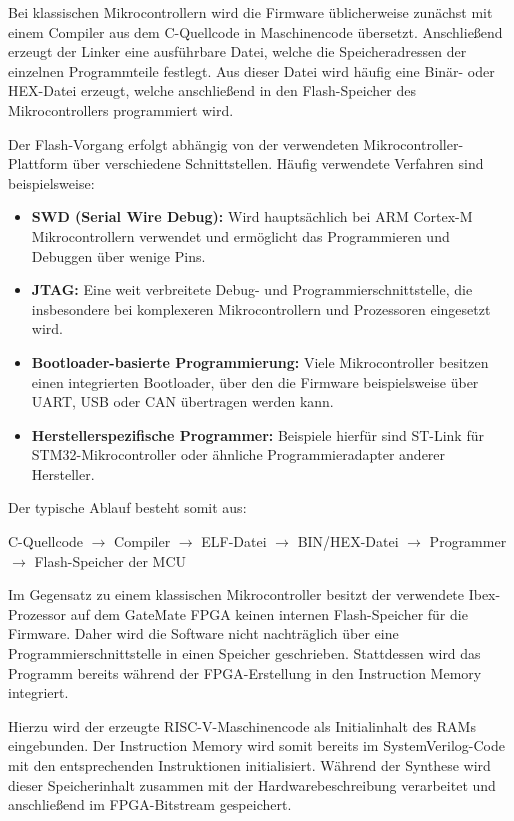 \documentclass[a4paper,11pt]{article}
\begin{document}
Bei klassischen Mikrocontrollern wird die Firmware üblicherweise zunächst mit einem Compiler aus dem C-Quellcode in Maschinencode übersetzt. Anschließend erzeugt der Linker eine ausführbare Datei, welche die Speicheradressen der einzelnen Programmteile festlegt. Aus dieser Datei wird häufig eine Binär- oder HEX-Datei erzeugt, welche anschließend in den Flash-Speicher des Mikrocontrollers programmiert wird.

Der Flash-Vorgang erfolgt abhängig von der verwendeten Mikrocontroller-Plattform über verschiedene Schnittstellen. Häufig verwendete Verfahren sind beispielsweise:

\begin{itemize}
	\item \textbf{SWD (Serial Wire Debug):} Wird hauptsächlich bei ARM Cortex-M Mikrocontrollern verwendet und ermöglicht das Programmieren und Debuggen über wenige Pins.
	\item \textbf{JTAG:} Eine weit verbreitete Debug- und Programmierschnittstelle, die insbesondere bei komplexeren Mikrocontrollern und Prozessoren eingesetzt wird.
	\item \textbf{Bootloader-basierte Programmierung:} Viele Mikrocontroller besitzen einen integrierten Bootloader, über den die Firmware beispielsweise über UART, USB oder CAN übertragen werden kann.
	\item \textbf{Herstellerspezifische Programmer:} Beispiele hierfür sind ST-Link für STM32-Mikrocontroller oder ähnliche Programmieradapter anderer Hersteller.
\end{itemize}

Der typische Ablauf besteht somit aus:
\begin{center}
	C-Quellcode $\rightarrow$ Compiler $\rightarrow$ ELF-Datei $\rightarrow$ BIN/HEX-Datei $\rightarrow$ Programmer $\rightarrow$ Flash-Speicher der MCU
\end{center}

Im Gegensatz zu einem klassischen Mikrocontroller besitzt der verwendete Ibex-Prozessor auf dem GateMate FPGA keinen internen Flash-Speicher für die Firmware. Daher wird die Software nicht nachträglich über eine Programmierschnittstelle in einen Speicher geschrieben. Stattdessen wird das Programm bereits während der FPGA-Erstellung in den Instruction Memory integriert.

Hierzu wird der erzeugte RISC-V-Maschinencode als Initialinhalt des RAMs eingebunden. Der Instruction Memory wird somit bereits im SystemVerilog-Code mit den entsprechenden Instruktionen initialisiert. Während der Synthese wird dieser Speicherinhalt zusammen mit der Hardwarebeschreibung verarbeitet und anschließend im FPGA-Bitstream gespeichert.
\end{document}
